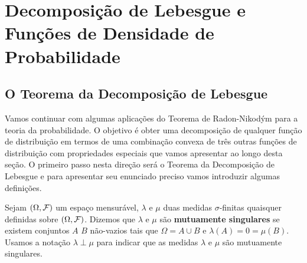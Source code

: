 \chapter[Aula 14]{Decomposição de Lebesgue e Funções de Densidade de Probabilidade}
\chaptermark{}

\section{O Teorema da Decomposição de Lebesgue}

Vamos continuar com algumas aplicações do Teorema 
de Radon-Nikodým para a teoria da probabilidade.
O objetivo é obter uma decomposição de qualquer 
função de distribuição em termos de uma combinação 
convexa de três outras funções de distribuição 
com propriedades especiais que vamos apresentar
ao longo desta seção. O primeiro passo nesta
direção será o Teorema da Decomposição de Lebesgue 
e para apresentar seu enunciado preciso vamos 
introduzir algumas definições. 


\begin{definicao}
Sejam $(\Omega,\mathcal{F})$ um espaço mensurável,
$\lambda$ e $\mu$ duas medidas $\sigma$-finitas
quaisquer definidas sobre $(\Omega,\mathcal{F})$.
Dizemos que $\lambda$ e $\mu$ são 
{\bf mutuamente singulares} 
se existem conjuntos $A$ $B$ não-vazios 
tais que $\Omega = A\cup B$ e $\lambda(A)=0=\mu(B)$.
Usamos a notação $\lambda\perp \mu$ para indicar 
que as medidas $\lambda$ e $\mu$ são mutuamente 
singulares. 
\end{definicao}


